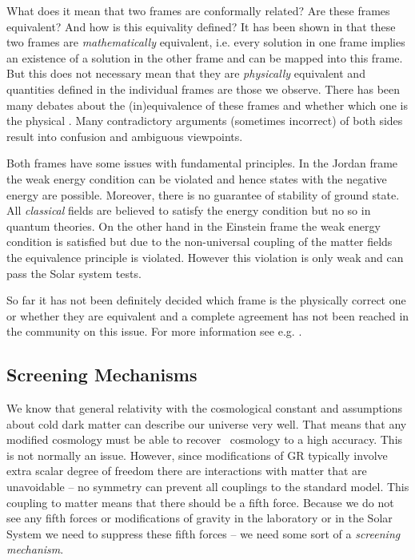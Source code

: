 What does it mean that two frames are conformally related? Are these frames equivalent? And how is this equivality defined? It has been shown in \textcite{Magnano:1993bd} that these two frames are \textit{mathematically} equivalent, i.e. every solution in one frame implies an existence of a solution in the other frame and can be mapped into this frame. But this does not necessary mean that they are \textit{physically} equivalent and quantities defined in the individual frames are those we observe. There has been many debates about the (in)equivalence of these frames \parencite{Postma:2014vaa} and whether which one is the physical \parencite{Faraoni:1999hp}. Many contradictory arguments (sometimes incorrect) of both sides result into confusion and ambiguous viewpoints.

Both frames have some issues with fundamental principles. In the Jordan frame the weak energy condition can be violated and hence states with the negative energy are possible. Moreover, there is no guarantee of stability of ground state. All \textit{classical} fields are believed to satisfy the energy condition but no so in quantum theories. On the other hand in the Einstein frame the weak energy condition is satisfied but due to the non-universal coupling of the matter fields the equivalence principle is violated. However this violation is only weak and can pass the Solar system tests.

So far it has not been definitely decided which frame is the physically correct one or whether they are equivalent and a complete agreement has not been reached in the community on this issue. For more information see e.g. \textcite{Carloni:2009gp,Capozziello:2011et}.

\subsection{Screening Mechanisms}
We know that general relativity with the cosmological constant and assumptions about cold dark matter can describe our universe very well. That means that any modified cosmology must be able to recover \LCDM\ cosmology to a high accuracy. This is not normally an issue. However, since modifications of GR typically involve extra scalar degree of freedom there are interactions with matter that are unavoidable -- no symmetry can prevent all couplings to the standard model. This coupling to matter means that there should be a fifth force. Because we do not see any fifth forces or modifications of gravity in the laboratory or in the Solar System we need to suppress these fifth forces -- we need some sort of a \textit{screening mechanism}.

